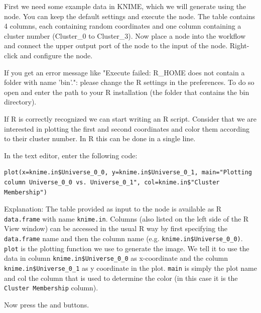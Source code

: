 \begin{task}
First we need some example data in KNIME, which we will generate using the  node. You can keep the default settings and execute the node. The table contains 4 columns, each containing random coordinates and one column containing a cluster number (Cluster\_0 to Cluster\_3). Now place a  node into the workflow and connect the upper output port of the  node to the input of the  node.
Right-click and configure the node.

If you get an error message like "Execute failed: R\_HOME does not contain a folder with name 'bin'.": please change the R settings in the preferences. To do so open  and enter the path to your R installation (the folder that contains the bin directory).

If R is correctly recognized we can start writing an R script. Consider that we are interested in plotting the first and second coordinates and color them according to their cluster number. In R this can be done in a single line.

In the  text editor, enter the following code:
\begin{lstlisting}
plot(x=knime.in$Universe_0_0, y=knime.in$Universe_0_1, main="Plotting column Universe_0_0 vs. Universe_0_1", col=knime.in$"Cluster Membership")
\end{lstlisting}
        
Explanation:
The table provided as input to the  node is available as R \texttt{data.frame} with name \texttt{knime.in}. Columns (also listed on the left side of the R View window) can be accessed in the usual R way by first specifying the \texttt{data.frame} name and then the column name (e.g. \texttt{knime.in\$Universe\_0\_0)}.
\texttt{plot} is the plotting function we use to generate the image. We tell it to use the data in column \texttt{knime.in\$Universe\_0\_0} as x-coordinate and the column \texttt{knime.in\$Universe\_0\_1} as y coordinate in the plot. \texttt{main} is simply the plot name and col the column that is used to determine the color (in this case it is the \texttt{Cluster Membership} column).

Now press the  and  buttons.
\end{task}

